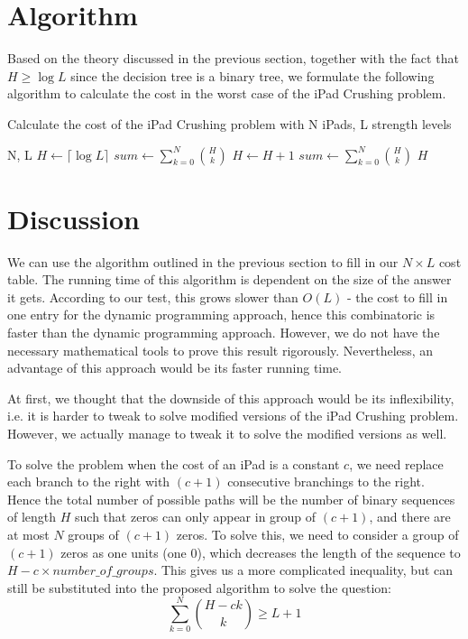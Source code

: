 \documentclass[12pt,a4paper,oneside]{report}
\begin{document}
\section{Algorithm}
Based on the theory discussed in the previous section, together with the fact that $H \geq \log L$ since the decision tree is a binary tree, we formulate the following algorithm to calculate the cost in the worst case of the iPad Crushing problem.

\begin{algorithm}
        \caption{Calculate the cost of the iPad Crushing problem with N iPads, L strength levels}
        \begin{algorithmic}[1]
            \REQUIRE N, L
	\STATE $H \leftarrow \lceil \log L\rceil$
	\STATE $sum \leftarrow \sum_{k=0}^{N} {H \choose k}$
		\STATE $H \leftarrow H+1$
		\STATE $sum \leftarrow \sum_{k=0}^{N} {H \choose k}$
	\ENDWHILE
	\RETURN $H$
        \end{algorithmic}
\end{algorithm}

\section{Discussion}
We can use the algorithm outlined in the previous section to fill in our $N \times L$ cost table. The running time of this algorithm is dependent on the size of the answer it gets. According to our test, this grows slower than $O(L)$ - the cost to fill in one entry for the dynamic programming approach, hence this combinatoric is faster than the dynamic programming approach. However, we do not have the necessary mathematical tools to prove this result rigorously. Nevertheless, an advantage of this approach would be its faster running time.

At first, we thought that the downside of this approach would be its inflexibility, i.e. it is harder to tweak to solve modified versions of the iPad Crushing problem. However, we actually manage to tweak it to solve the modified versions as well.

To solve the problem when the cost of an iPad is a constant $c$, we need replace each branch to the right with $(c+1)$ consecutive branchings to the right. Hence the total number of possible paths will be the number of binary sequences of length $H$ such that zeros can only appear in group of $(c+1)$, and there are at most $N$ groups of $(c+1)$ zeros. To solve this, we need to consider a group of $(c+1)$ zeros as one units (one 0), which decreases the length of the sequence to $H - c \times number\_of\_groups$. This gives us a more complicated inequality, but can still be substituted into the proposed algorithm to solve the question: \[\sum_{k=0}^{N} {H-ck \choose k} \geq L+1\]
\end{document}
